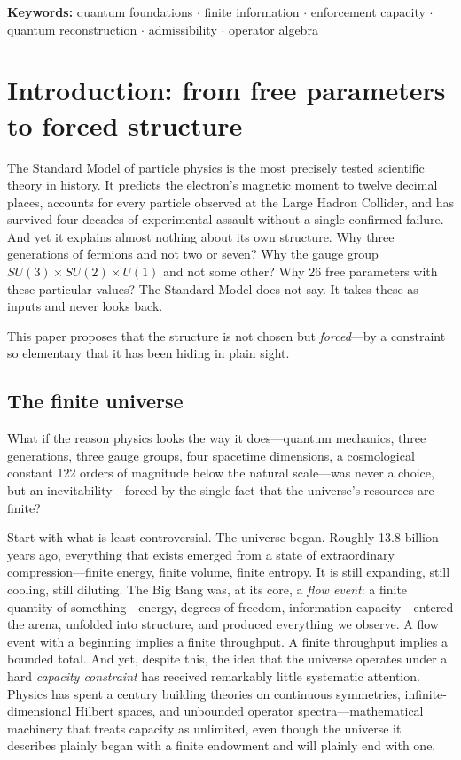 \documentclass[11pt]{article}
\begin{document}
\noindent\textbf{Keywords:} quantum foundations $\cdot$ finite information $\cdot$ enforcement capacity $\cdot$ quantum reconstruction $\cdot$ admissibility $\cdot$ operator algebra

\bigskip

\section{Introduction: from free parameters to forced structure}

The Standard Model of particle physics is the most precisely tested scientific theory in history.  It predicts the electron's magnetic moment to twelve decimal places, accounts for every particle observed at the Large Hadron Collider, and has survived four decades of experimental assault without a single confirmed failure.  And yet it explains almost nothing about its own structure.  Why three generations of fermions and not two or seven?  Why the gauge group $SU(3) \times SU(2) \times U(1)$ and not some other?  Why 26 free parameters with these particular values?  The Standard Model does not say.  It takes these as inputs and never looks back.

This paper proposes that the structure is not chosen but \emph{forced}---by a constraint so elementary that it has been hiding in plain sight.

\subsection{The finite universe}

What if the reason physics looks the way it does---quantum mechanics, three generations, three gauge groups, four spacetime dimensions, a cosmological constant 122 orders of magnitude below the natural scale---was never a choice, but an inevitability---forced by the single fact that the universe's resources are finite?

Start with what is least controversial.  The universe began.  Roughly 13.8 billion years ago, everything that exists emerged from a state of extraordinary compression---finite energy, finite volume, finite entropy.  It is still expanding, still cooling, still diluting.  The Big Bang was, at its core, a \emph{flow event}: a finite quantity of something---energy, degrees of freedom, information capacity---entered the arena, unfolded into structure, and produced everything we observe.  A flow event with a beginning implies a finite throughput.  A finite throughput implies a bounded total.  And yet, despite this, the idea that the universe operates under a hard \emph{capacity constraint} has received remarkably little systematic attention.  Physics has spent a century building theories on continuous symmetries, infinite-dimensional Hilbert spaces, and unbounded operator spectra---mathematical machinery that treats capacity as unlimited, even though the universe it describes plainly began with a finite endowment and will plainly end with one.
\end{document}
